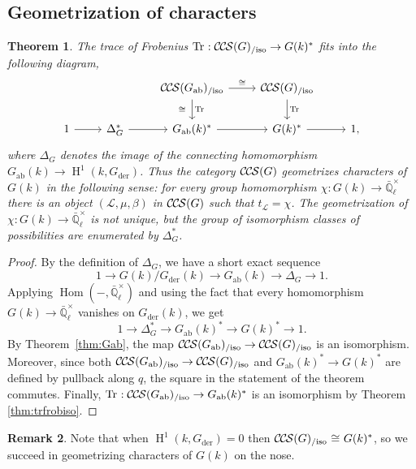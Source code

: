\documentclass[10pt]{amsart}
\theoremstyle{plain}
\newtheorem{theorem}{Theorem}[section]
\theoremstyle{definition}
\newtheorem{remark}[theorem]{Remark}
\newcommand{\EE}{\mathbb{\bar Q}_\ell}
\newcommand{\Fq}{k}
\newcommand{\EEx}{\EE^\times}
\DeclareMathOperator{\Hom}{Hom}
\DeclareMathOperator{\Hh}{H}
\newcommand{\der}{_{\operatorname{der}}}
\newcommand{\ab}{_{\operatorname{ab}}}
\newcommand{\iso}{{\ \cong\ }}
\newcommand{\trFrob}[1]{t_{#1}}
\DeclareMathOperator{\Tr}{Tr}
\newcommand{\TrFrob}[1]{\Tr_{#1}}
\newcommand{\cs}[1]{{\mathcal{#1}}}
\newcommand{\CCS}{{\mathcal{C\hskip-.8pt C\hskip-0.8pt S}}}
\newcommand{\CCSiso}[1]{\CCS(#1)_{/\text{iso}}}
\begin{document}
\subsection{Geometrization of characters} \label{ssec:geo}

\begin{theorem}\label{thm:geo}
The trace of Frobenius $\TrFrob{} : \CCSiso{G}\to G(\Fq)^*$ fits into the following diagram,
\[
\begin{tikzcd}
\ & & \CCSiso{G\ab} \arrow{d}{\TrFrob{}}[swap]{\iso} \arrow{r}{\iso} & \CCSiso{G} \arrow{d}{\TrFrob{}}& \\
1 \arrow{r} & \Delta_G^* \arrow{r} & G\ab(k)^* \arrow{r} & G(k)^* \arrow{r} & 1,
\end{tikzcd}
\]
where $\Delta_G$ denotes the image of the connecting homomorphism $G\ab(\Fq) \to \Hh^1(\Fq, G\der)$. 
Thus the category $\CCS(G)$ geometrizes characters of $G(\Fq)$ in the following sense: for every group homomorphism $\chi : G(\Fq) \to \EEx$ there is an object $(\cs{L},\mu,\beta)$ in $\CCS(G)$ such that $\trFrob{\cs{L}} = \chi$. The geometrization of $\chi : G(\Fq) \to \EEx$ is not unique, but the group of isomorphism classes of possibilities are enumerated by $\Delta_G^*$.
\end{theorem}

\begin{proof}
By the definition of $\Delta_G$, we have a short exact sequence
\[
1 \to G(k) / G\der(k) \to G\ab(k) \to \Delta_G \to 1.
\]
Applying $\Hom(-, \EEx)$ and using the fact that every homomorphism $G(k) \to \EEx$ vanishes on $G\der(k)$, we get
\[
1 \to \Delta_G^* \to G\ab(k)^* \to G(k)^* \to 1.
\]
By Theorem~\ref{thm:Gab}, the map $\CCSiso{G\ab} \to \CCSiso{G}$ is an isomorphism.
Moreover, since both $\CCSiso{G\ab} \to \CCSiso{G}$ and $G\ab(k)^* \to G(k)^*$ are
defined by pullback along $q$, the square in the statement of the theorem commutes.
Finally, $\TrFrob{} : \CCSiso{G\ab} \to G\ab(k)^*$ is an isomorphism by Theorem \ref{thm:trfrobiso}.
\end{proof}

\begin{remark}
Note that when $\Hh^1(k,G\der) = 0$ then $\CCSiso{G} \iso G(\Fq)^*$, so
we succeed in geometrizing characters of $G(k)$ on the nose.
\end{remark}
\end{document}
